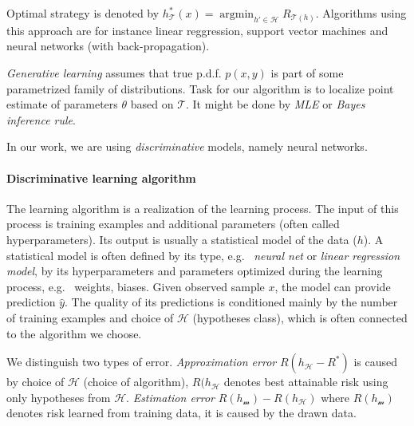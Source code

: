 Optimal strategy is denoted by $h_{\mathcal{T}}^*(x)=\operatorname*{argmin}_{{h}'\in \mathcal{H}}R_{\mathcal{T}(h)}$. Algorithms using this approach are for instance linear reggression, support vector machines and neural networks (with back-propagation).

\emph{Generative learning} assumes that true p.d.f. $p(x,y)$ is part of some parametrized family of distributions. Task for our algorithm is to localize point estimate of parameters $\theta$ based on $\mathcal{T}$. It might be done by \emph{MLE} or \emph{Bayes inference rule}.

In our work, we are using \emph{discriminative} models, namely neural networks.

\paragraph{Discriminative learning algorithm}
The learning algorithm is a realization of the learning process. The input of this process is training examples and additional parameters (often called hyperparameters). Its output is usually a statistical model of the data ($h$). A statistical model is often defined by its type, e.g. \ \emph{neural net} or \emph{linear regression model}, by its hyperparameters and parameters optimized during the learning process, e.g. \ weights, biases. Given observed sample $x$, the model can provide prediction  $\hat{y}$. The quality of its predictions is conditioned mainly by the number of training examples and choice of $\mathcal{H}$ (hypotheses class), which is often connected to the algorithm we choose. 

We distinguish two types of error. \emph{Approximation error} $R(h_{\mathcal{H}}-R^*)$  is caused by choice of $\mathcal{H}$ (choice of algorithm), $R(h_{\mathcal{H}}$ denotes best attainable risk using only hypotheses from $\mathcal{H}$. \emph{Estimation error} $R(h_{\mathcal{m}})-R(h_{\mathcal{H}})$ where $R(h_{\mathcal{m}})$ denotes risk learned from training data, it is caused by the drawn data.


